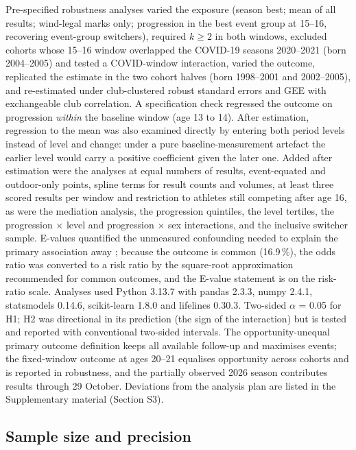 \documentclass[12pt,a4paper]{article}
\begin{document}
Pre-specified robustness analyses varied the exposure (season best; mean of all results; wind-legal marks only; progression in the best event group at 15--16, recovering event-group switchers), required $k \geq 2$ in both windows, excluded cohorts whose 15--16 window overlapped the COVID-19 seasons 2020--2021 (born 2004--2005) and tested a COVID-window interaction, varied the outcome, replicated the estimate in the two cohort halves (born 1998--2001 and 2002--2005), and re-estimated under club-clustered robust standard errors and GEE with exchangeable club correlation. A specification check regressed the outcome on progression \emph{within} the baseline window (age 13 to 14). After estimation, regression to the mean was also examined directly by entering both period levels instead of level and change: under a pure baseline-measurement artefact the earlier level would carry a positive coefficient given the later one. Added after estimation were the analyses at equal numbers of results, event-equated and outdoor-only points, spline terms for result counts and volumes, at least three scored results per window and restriction to athletes still competing after age 16, as were the mediation analysis, the progression quintiles, the level tertiles, the progression $\times$ level and progression $\times$ sex interactions, and the inclusive switcher sample. E-values quantified the unmeasured confounding needed to explain the primary association away \citep{vanderweele2017}; because the outcome is common (16.9\,\%), the odds ratio was converted to a risk ratio by the square-root approximation recommended for common outcomes, and the E-value statement is on the risk-ratio scale. Analyses used Python 3.13.7 with pandas 2.3.3, numpy 2.4.1, statsmodels 0.14.6, scikit-learn 1.8.0 and lifelines 0.30.3. Two-sided $\alpha$ = 0.05 for H1; H2 was directional in its prediction (the sign of the interaction) but is tested and reported with conventional two-sided intervals. The opportunity-unequal primary outcome definition keeps all available follow-up and maximises events; the fixed-window outcome at ages 20--21 equalises opportunity across cohorts and is reported in robustness, and the partially observed 2026 season contributes results through 29 October. Deviations from the analysis plan are listed in the Supplementary material (Section S3).

\subsection{Sample size and precision}
\end{document}
